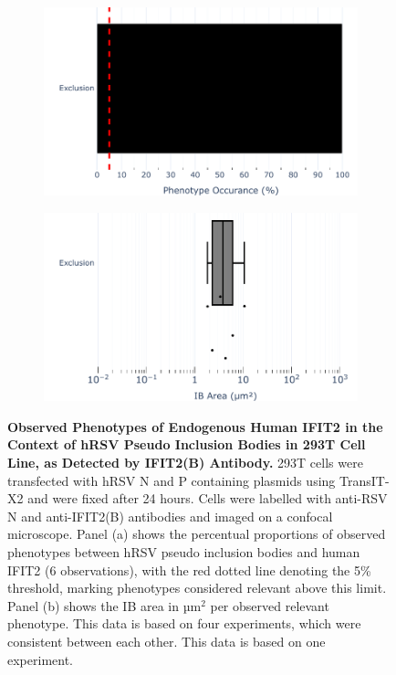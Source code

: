 \begin{figure}
    \begin{subfigure}{0.495\textwidth}
        \caption{}
        \includegraphics[width=1\linewidth]{09. Chapter 4/Figs/01. pIB/03. IFIT2/03. IFIT2B/01. bar_i2b_293t.pdf} 
    \end{subfigure}
    \begin{subfigure}{0.495\textwidth}
        \caption{}
        \includegraphics[width=1\linewidth]{09. Chapter 4/Figs/01. pIB/03. IFIT2/03. IFIT2B/02. box_i2b_293t.pdf}
    \end{subfigure}
    \caption[Observed Phenotypes of Endogenous Human IFIT2 in the Context of hRSV Pseudo Inclusion Bodies in 293T Cell Line, as Detected by IFIT2(B) Antibody.]{\textbf{Observed Phenotypes of Endogenous Human IFIT2 in the Context of hRSV Pseudo Inclusion Bodies in 293T Cell Line, as Detected by IFIT2(B) Antibody.} 293T cells were transfected with hRSV N and P containing plasmids using TransIT-X2 and were fixed after 24 hours. Cells were labelled with anti-RSV N and anti-IFIT2(B) antibodies and imaged on a confocal microscope. Panel (a) shows the percentual proportions of observed phenotypes between hRSV pseudo inclusion bodies and human IFIT2 (6 observations), with the red dotted line denoting the 5\% threshold, marking phenotypes considered relevant above this limit. Panel (b) shows the IB area in \(\mbox{µm}^2\) per observed relevant phenotype. This data is based on four experiments, which were consistent between each other.
This data is based on one experiment.}
    \label{fig:Observed Phenotypes of Endogenous Human IFIT2 in the Context of hRSV Pseudo Inclusion Bodies in 293T Cell Line, as Detected by IFIT2(B) Antibody}
\end{figure}


